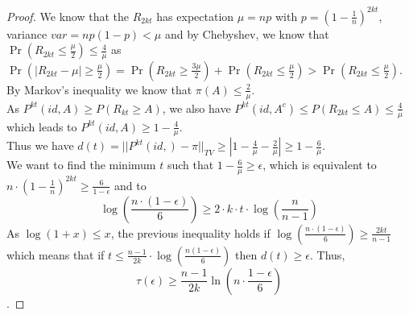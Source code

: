 \documentclass{llncs}
\begin{document}
\begin{proof}
We know that the $R_{2kt}$ has expectation $\mu = np$  with $p=\left ( 1 - \frac{1}{n} \right )^{2kt}$, variance $var = np(1-p) <\mu$ and by Chebyshev, we know that $\Pr(R_{2kt}\leq \frac{\mu}{2})\leq \frac{4}{\mu}$
as $\Pr(|R_{2kt} - \mu|\geq \frac{\mu}{2}) = \Pr(R_{2kt} \geq \frac{3\mu}{2}) + \Pr(R_{2kt} \leq \frac{\mu}{2}) > \Pr(R_{2kt} \leq \frac{\mu}{2})$.\\

By Markov's inequality we know that $\pi(A) \leq \frac{2}{\mu}$.\\

As $P^{kt}(id,A) \geq P(R_{kt}\geq A) $, we also have $P^{kt}(id,A^c) \leq P(R_{2kt}\leq A) \leq \frac{4}{\mu} $ which leads to $P^{kt}(id,A)\geq1 - \frac{4}{\mu}$.\\

Thus we have $d(t)=||P^{kt}(id,) - \pi ||_{TV} \geq |1 - \frac{4}{\mu} - \frac{2}{\mu}| \geq 1 - \frac{6}{\mu}$.\\

We want to find the minimum $t$ such that $1-\frac{6}{\mu}\geq \epsilon$, which is equivalent to $n \cdot \left ( 1 - \frac{1}{n} \right )^{2kt} \geq \frac{6}{1-\epsilon}$ and to
$$\log\left(\frac{n\cdot (1-\epsilon)}{6}\right) \geq 2\cdot k\cdot t \cdot \log \left ( \frac{n}{n-1} \right )$$
As $\log(1+x) \leq x$, the previous inequality holds if $\log\left(\frac{n\cdot (1-\epsilon)}{6}\right) \geq   \frac{2kt}{n-1} $ which means that if $t\leq \frac{n-1}{2k}\cdot \log\left ( \frac{n(1-\epsilon)}{6}\right )$ then $d(t)\geq \epsilon$.
Thus,
$$\tau \left (\epsilon \right ) \geq \frac{n-1}{2k} \ln(n\cdot \frac{1-\epsilon}{6}) $$.
\end{proof}
\end{document}
